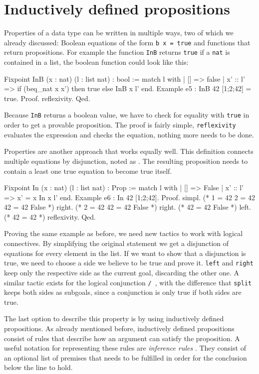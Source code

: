 \documentclass[fleqn]{scrreprt}
\newcommand{\coqinline}[1]{\texttt{#1}}
\begin{document}
\section{Inductively defined propositions}
Properties of a data type can be written in multiple ways, two of which we already discussed: Boolean equations of the form \coqinline{b x = true} and functions that return propositions. For example the function \coqinline{InB} returns \coqinline{true} if a \coqinline{nat} is contained in a list, the boolean function could look like this:
\begin{coqcode}
Fixpoint InB (x : nat) (l : list nat) : bool :=
match l with
| [] => false
| x' :: l' => if (beq_nat x x') then true else InB x l'
end.
Example e5 : InB 42 [1;2;42] = true.
Proof. reflexivity. Qed.
\end{coqcode}
Because \coqinline{InB} returns a boolean value, we have to check for equality with \coqinline{true} in order to get a provable proposition. The proof is fairly simple, \coqinline{reflexivity} evaluates the expression and checks the equation, nothing more needs to be done.
\par 
Properties are another approach that works equally well. This definition connects multiple equations by disjunction, noted as \coqinline{\/}. The resulting proposition needs to contain a least one true equation to become true itself.
\begin{coqcode}
Fixpoint In (x : nat) (l : list nat) : Prop :=
match l with
| [] => False
| x' :: l' => x' = x \/ In x l'
end.
Example e6 : In 42 [1;2;42].
Proof. 
  simpl. (* 1 = 42 \/ 2 = 42 \/ 42 = 42 \/ False *)
  right.           (* 2 = 42 \/ 42 = 42 \/ False *)
  right.                     (* 42 = 42 \/ False *)
  left.                      (* 42 = 42 *)
  reflexivity.
Qed.
\end{coqcode}
Proving the same example as before, we need new tactics to work with logical connectives. By simplifying the original statement we get a disjunction of equations for every element in the list. If we want to show that a disjunction is true, we need to choose a side we believe to be true and prove it. \coqinline{left} and \coqinline{right} keep only the respective side as the current goal, discarding the other one. A similar tactic exists for the logical conjunction \coqinline{/\ }, with the difference that \coqinline{split} keeps both sides as subgoals, since a conjunction is only true if both sides are true.
\par
The last option to describe this property is by using inductively defined propositions. As already mentioned before, inductively defined propositions consist of rules that describe how an argument can satisfy the proposition. A useful notation for representing these rules are \textit{inference rules} \label{infrules}. They consist of an optional list of premises that needs to be fulfilled in order for the conclusion below the line to hold.
\end{document}
